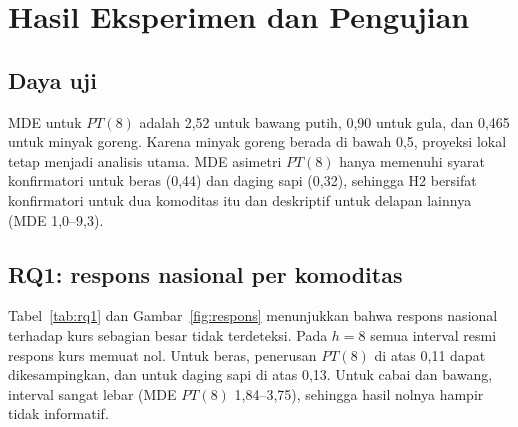 \documentclass[11pt,a4paper]{article}
\begin{document}
\section{Hasil Eksperimen dan Pengujian}

\subsection{Daya uji}

MDE untuk $PT(8)$ adalah 2,52 untuk bawang putih, 0,90 untuk gula, dan 0,465 untuk minyak goreng. Karena minyak goreng berada di
bawah 0,5, proyeksi lokal tetap menjadi analisis utama. MDE asimetri $PT(8)$ hanya memenuhi syarat konfirmatori untuk beras (0,44)
dan daging sapi (0,32), sehingga H2 bersifat konfirmatori untuk dua komoditas itu dan deskriptif untuk delapan lainnya (MDE 1,0–9,3).

\subsection{RQ1: respons nasional per komoditas}

Tabel~\ref{tab:rq1} dan Gambar~\ref{fig:respons} menunjukkan bahwa respons nasional terhadap kurs sebagian besar tidak terdeteksi.
Pada $h=8$ semua interval resmi respons kurs memuat nol. Untuk beras, penerusan $PT(8)$ di atas 0,11 dapat dikesampingkan, dan untuk
daging sapi di atas 0,13. Untuk cabai dan bawang, interval sangat lebar (MDE $PT(8)$ 1,84–3,75), sehingga hasil nolnya hampir tidak
informatif.
\end{document}
